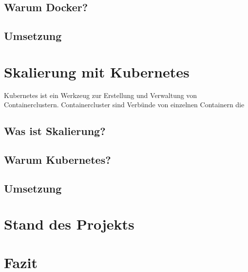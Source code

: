 \documentclass[12pt,a4paper]{article}
\begin{document}
\subsection{Warum Docker?}

\subsection{Umsetzung}

\section{Skalierung mit \gls{Kubernetes}} \label{kubernetes}
Kubernetes ist ein Werkzeug zur Erstellung und Verwaltung von Containerclustern. Containercluster sind Verbünde von einzelnen Containern die 

\subsection{Was ist Skalierung?}

\subsection{Warum \gls{Kubernetes}?} 

\subsection{Umsetzung}

\section{Stand des Projekts} \label{project_status}

\section{Fazit}\label{conclusion}

\newpage


\printbibliography
\newpage
\printglossary
\newpage
\listoffigures
\newpage
\listoftables
\end{document}
